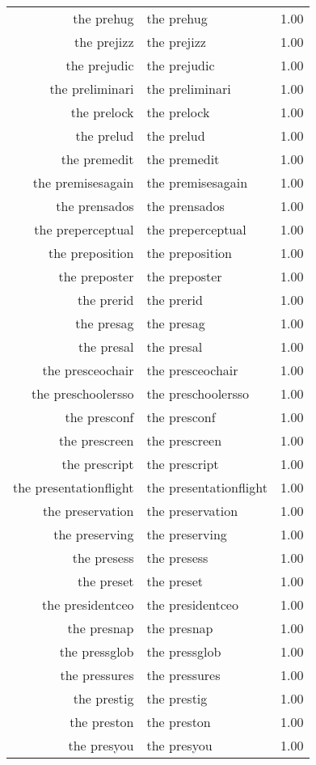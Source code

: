 \begin{table}[ht]
\begin{tabular}{rlr}
  the prehug & the prehug & 1.00 \\ 
  the prejizz & the prejizz & 1.00 \\ 
  the prejudic & the prejudic & 1.00 \\ 
  the preliminari & the preliminari & 1.00 \\ 
  the prelock & the prelock & 1.00 \\ 
  the prelud & the prelud & 1.00 \\ 
  the premedit & the premedit & 1.00 \\ 
  the premisesagain & the premisesagain & 1.00 \\ 
  the prensados & the prensados & 1.00 \\ 
  the preperceptual & the preperceptual & 1.00 \\ 
  the preposition & the preposition & 1.00 \\ 
  the preposter & the preposter & 1.00 \\ 
  the prerid & the prerid & 1.00 \\ 
  the presag & the presag & 1.00 \\ 
  the presal & the presal & 1.00 \\ 
  the presceochair & the presceochair & 1.00 \\ 
  the preschoolersso & the preschoolersso & 1.00 \\ 
  the presconf & the presconf & 1.00 \\ 
  the prescreen & the prescreen & 1.00 \\ 
  the prescript & the prescript & 1.00 \\ 
  the presentationflight & the presentationflight & 1.00 \\ 
  the preservation & the preservation & 1.00 \\ 
  the preserving & the preserving & 1.00 \\ 
  the presess & the presess & 1.00 \\ 
  the preset & the preset & 1.00 \\ 
  the presidentceo & the presidentceo & 1.00 \\ 
  the presnap & the presnap & 1.00 \\ 
  the pressglob & the pressglob & 1.00 \\ 
  the pressures & the pressures & 1.00 \\ 
  the prestig & the prestig & 1.00 \\ 
  the preston & the preston & 1.00 \\ 
  the presyou & the presyou & 1.00 \\ 

\end{tabular}
\end{table}
